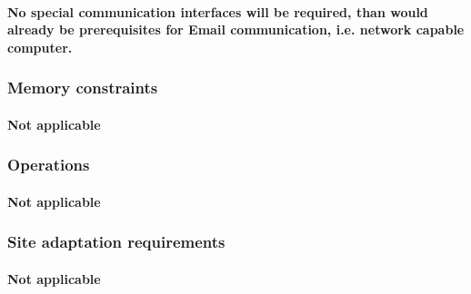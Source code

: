 \paragraph{No special communication interfaces will be required, than would already be prerequisites for Email communication, i.e. network capable computer.}

\subsubsection{Memory constraints}
\paragraph{Not applicable}


\subsubsection{Operations}
%
\paragraph{Not applicable}

\subsubsection{Site adaptation requirements}
\paragraph{Not applicable}







